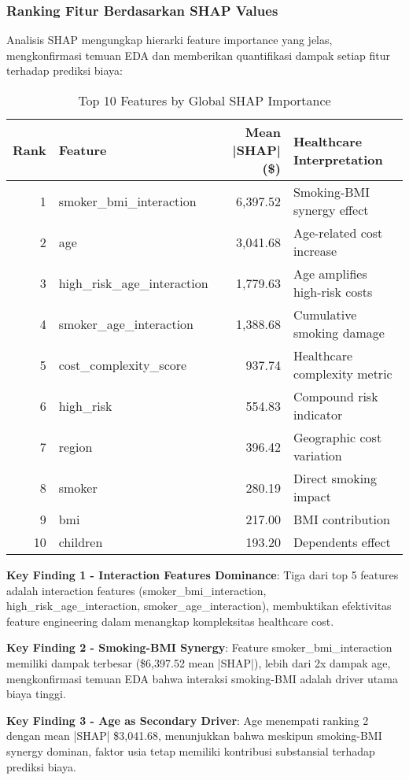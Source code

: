 \subsubsection{Ranking Fitur Berdasarkan SHAP Values}

Analisis SHAP mengungkap hierarki feature importance yang jelas, mengkonfirmasi temuan EDA dan memberikan quantifikasi dampak setiap fitur terhadap prediksi biaya:

\begin{table}[H]
\centering
\caption{Top 10 Features by Global SHAP Importance}
\label{tab:shap-feature-importance}
\begin{tabular}{|r|l|r|l|}
\hline
\textbf{Rank} & \textbf{Feature} & \textbf{Mean |SHAP| (\$)} & \textbf{Healthcare Interpretation} \\
\hline
1 & smoker\_bmi\_interaction & 6,397.52 & Smoking-BMI synergy effect \\
2 & age & 3,041.68 & Age-related cost increase \\
3 & high\_risk\_age\_interaction & 1,779.63 & Age amplifies high-risk costs \\
4 & smoker\_age\_interaction & 1,388.68 & Cumulative smoking damage \\
5 & cost\_complexity\_score & 937.74 & Healthcare complexity metric \\
6 & high\_risk & 554.83 & Compound risk indicator \\
7 & region & 396.42 & Geographic cost variation \\
8 & smoker & 280.19 & Direct smoking impact \\
9 & bmi & 217.00 & BMI contribution \\
10 & children & 193.20 & Dependents effect \\
\hline
\end{tabular}
\end{table}

\textbf{Key Finding 1 - Interaction Features Dominance}: Tiga dari top 5 features adalah interaction features (smoker\_bmi\_interaction, high\_risk\_age\_interaction, smoker\_age\_interaction), membuktikan efektivitas feature engineering dalam menangkap kompleksitas healthcare cost.

\textbf{Key Finding 2 - Smoking-BMI Synergy}: Feature smoker\_bmi\_interaction memiliki dampak terbesar (\$6,397.52 mean |SHAP|), lebih dari 2x dampak age, mengkonfirmasi temuan EDA bahwa interaksi smoking-BMI adalah driver utama biaya tinggi.

\textbf{Key Finding 3 - Age as Secondary Driver}: Age menempati ranking 2 dengan mean |SHAP| \$3,041.68, menunjukkan bahwa meskipun smoking-BMI synergy dominan, faktor usia tetap memiliki kontribusi substansial terhadap prediksi biaya.

